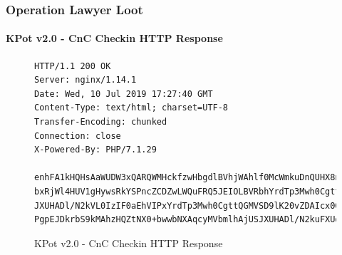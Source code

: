 \documentclass[aspectratio=169]{beamer}
\begin{document}
{
\begin{frame}[fragile]
  \frametitle{Operation Lawyer Loot}
  \framesubtitle{KPot v2.0 - CnC Checkin HTTP Response}
\begin{figure}
\footnotesize{
\begin{verbatim}
HTTP/1.1 200 OK
Server: nginx/1.14.1
Date: Wed, 10 Jul 2019 17:27:40 GMT
Content-Type: text/html; charset=UTF-8
Transfer-Encoding: chunked
Connection: close
X-Powered-By: PHP/7.1.29

enhFA1kHQHsAaWUDW3xQARQWMHckfzwHbgdlBVhjWAhlf0McWmkuDnQUHX8nEj5ROzkQUxxXLhV2ChVwKAgz
bxRjWl4HUV1gHywsRkYSPncZCDZwLWQuFRQ5JEIOLBVRbhYrdTp3Mwh0CgttWhI+dxkINnAtZC4VAGhmBjUS
JXUHADl/N2kVL0IzIF0aEhVIPxYrdTp3Mwh0CgttQGMVSD9lK20vZDAIcx0GbTVoFEMuOwRAB1AYJlR9CHYP
PgpEJDkrbS9kMAhzHQZtNX0+bwwbNXAqcyMVbmlhAjUSJXUHADl/N2kuFXUdGHsnAD5vFBYwdyR/PAduBw==
\end{verbatim}
}
\caption{KPot v2.0 - CnC Checkin HTTP Response}
\end{figure}
\end{frame}
}
\end{document}
